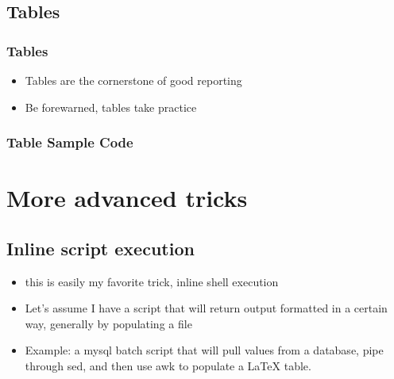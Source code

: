 \documentclass{beamer}
\begin{document}
\subsection{Tables}
\begin{frame}
  \frametitle{Tables}
  \begin{itemize}
  \item Tables are the cornerstone of good reporting
  \item Be forewarned, tables take practice
  \end{itemize}
  
\end{frame}

\begin{frame}
  \frametitle{Table Sample Code}  
    
\end{frame}

\section{More advanced tricks}
\subsection{Inline script execution}
\begin{frame}
  \begin{itemize}
    \item this is easily my favorite trick, inline shell execution
    \item Let's assume I have a script that will return output
      formatted in a certain way, generally by populating a file
    \item Example: a mysql batch script that will pull values from a
      database, pipe through sed, and then use awk to populate a LaTeX
      table.
  \end{itemize}
\end{frame}
\end{document}
